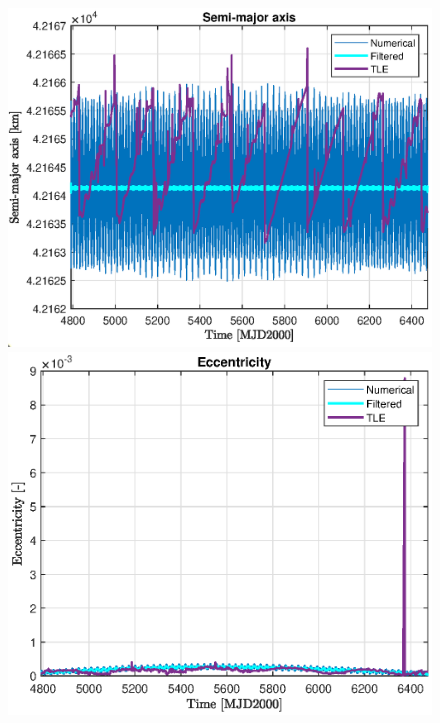 \newcommand{\n}{0.7}

\begin{figure}[H]
	\begin{minipage}{0.48\linewidth}
		\centering
		\includegraphics[width=\n\linewidth]{a_TLE.eps}
	\end{minipage}\hfill
	\begin{minipage}{0.48\linewidth}
		\centering
		\includegraphics[width=\n\linewidth]{e_TLE.eps}
	\end{minipage}
	\vfill
	\begin{minipage}{0.48\linewidth}

\end{minipage}
\end{figure}
